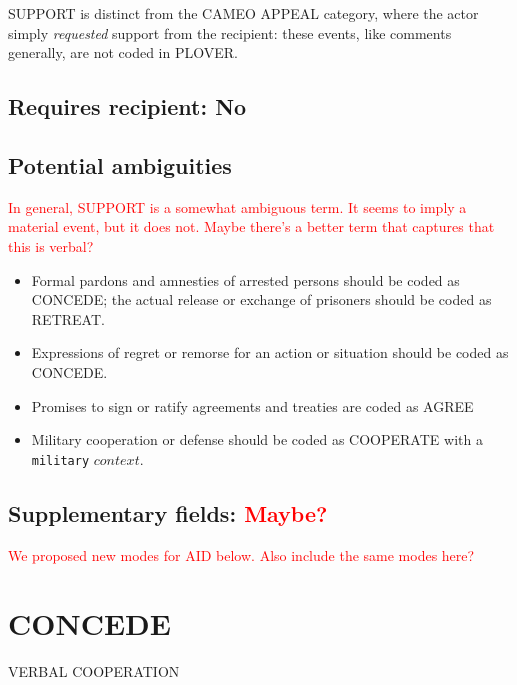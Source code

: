 \documentclass[11pt]{report}
\newcommand{\plcat}[1]{\textsf{#1}}
\newcommand{\txt}[1]{\texttt{#1}}
\newcommand{\andy}[1]{\textcolor{red}{#1}}
\begin{document}
\plcat{SUPPORT} is distinct from the CAMEO \plcat{APPEAL} category, where the actor simply \textit{requested} support from the recipient: these events, like comments generally, are not coded in PLOVER.
 
\subsection{Requires recipient: No}

\subsection{Potential ambiguities}

\andy{In general, \plcat{SUPPORT} is a somewhat ambiguous term. It seems to imply a material event, but it does not. Maybe there's a better term that captures that this is verbal?}

\begin{itemize}
\item Formal pardons and amnesties of arrested persons should be coded as \plcat{CONCEDE}; the actual release  or exchange of prisoners should be coded as \plcat{RETREAT}.

\item Expressions of regret or remorse for an action or situation should be coded as \plcat{CONCEDE}.

\item Promises to sign or ratify agreements and treaties are coded as \plcat{AGREE}

\item Military cooperation or defense should be coded as \plcat{COOPERATE} with a \txt{military} $context.$
\end{itemize}

\subsection{Supplementary fields: \andy{Maybe?}}

\andy{We proposed new modes for \plcat{AID} below. Also include the same modes here?}

\newpage

\section{CONCEDE}

\textsf{VERBAL COOPERATION} \vspace{8pt}
\end{document}
